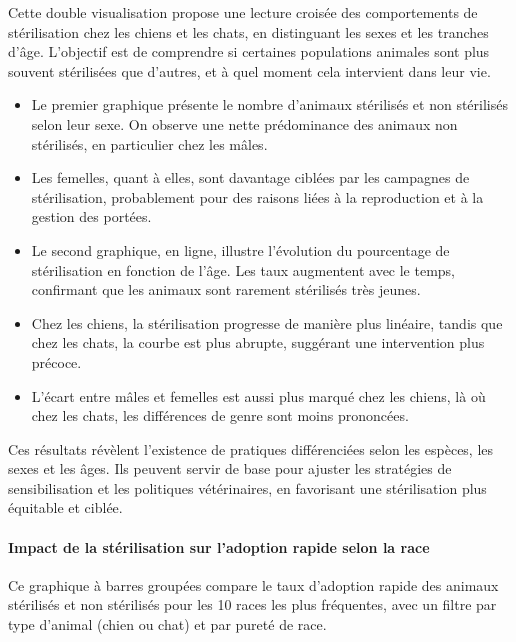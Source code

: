 \documentclass[a4paper,12pt]{article}
\begin{document}
Cette double visualisation propose une lecture croisée des comportements de stérilisation chez les chiens et les chats, en distinguant les sexes et les tranches d’âge. L’objectif est de comprendre si certaines populations animales sont plus souvent stérilisées que d’autres, et à quel moment cela intervient dans leur vie.

\begin{itemize}
    \item Le premier graphique présente le nombre d’animaux stérilisés et non stérilisés selon leur sexe. On observe une nette prédominance des animaux non stérilisés, en particulier chez les mâles.
    \item Les femelles, quant à elles, sont davantage ciblées par les campagnes de stérilisation, probablement pour des raisons liées à la reproduction et à la gestion des portées.
    \item Le second graphique, en ligne, illustre l’évolution du pourcentage de stérilisation en fonction de l’âge. Les taux augmentent avec le temps, confirmant que les animaux sont rarement stérilisés très jeunes.
    \item Chez les chiens, la stérilisation progresse de manière plus linéaire, tandis que chez les chats, la courbe est plus abrupte, suggérant une intervention plus précoce.
    \item L'écart entre mâles et femelles est aussi plus marqué chez les chiens, là où chez les chats, les différences de genre sont moins prononcées.
\end{itemize}

Ces résultats révèlent l’existence de pratiques différenciées selon les espèces, les sexes et les âges. Ils peuvent servir de base pour ajuster les stratégies de sensibilisation et les politiques vétérinaires, en favorisant une stérilisation plus équitable et ciblée.

\paragraph{Impact de la stérilisation sur l’adoption rapide selon la race}

Ce graphique à barres groupées compare le taux d’adoption rapide des animaux stérilisés et non stérilisés pour les 10 races les plus fréquentes, avec un filtre par type d’animal (chien ou chat) et par pureté de race.
\end{document}
